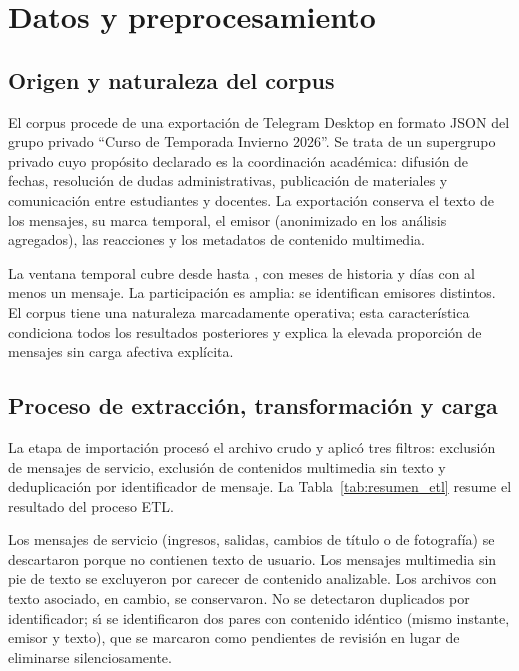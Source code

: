 \section{Datos y preprocesamiento}
\label{sec:datos}

\subsection{Origen y naturaleza del corpus}

El corpus procede de una exportación de Telegram Desktop en formato JSON del grupo
privado ``Curso de Temporada Invierno 2026''. Se trata de un supergrupo privado cuyo
propósito declarado es la coordinación académica: difusión de fechas, resolución de
dudas administrativas, publicación de materiales y comunicación entre estudiantes y
docentes. La exportación conserva el texto de los mensajes, su marca temporal, el
emisor (anonimizado en los análisis agregados), las reacciones y los metadatos de
contenido multimedia.

La ventana temporal cubre desde \manualInicio{} hasta \manualFin{}, con \meses{} meses de
historia y \diasActividad{} días con al menos un mensaje. La participación es amplia:
se identifican \nRemitentes{} emisores distintos. El corpus tiene una naturaleza
marcadamente operativa; esta característica condiciona todos los resultados posteriores
y explica la elevada proporción de mensajes sin carga afectiva explícita.

\subsection{Proceso de extracción, transformación y carga}

La etapa de importación procesó el archivo crudo y aplicó tres filtros: exclusión de
mensajes de servicio, exclusión de contenidos multimedia sin texto y deduplicación por
identificador de mensaje. La Tabla~\ref{tab:resumen_etl} resume el resultado del proceso ETL.



Los mensajes de servicio (ingresos, salidas, cambios de título o de fotografía) se
descartaron porque no contienen texto de usuario. Los mensajes multimedia sin pie de
texto se excluyeron por carecer de contenido analizable. Los archivos con texto
asociado, en cambio, se conservaron. No se detectaron duplicados por identificador; s\'\i{}
se identificaron dos pares con contenido idéntico (mismo instante, emisor y texto), que
se marcaron como pendientes de revisión en lugar de eliminarse silenciosamente.

